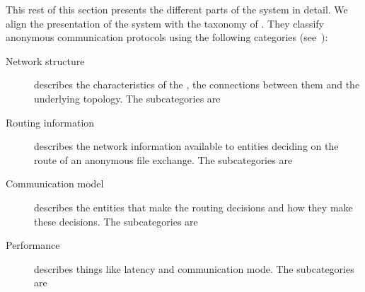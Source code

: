 This rest of this section presents the different parts of the system in detail.
We align the presentation of the system with the taxonomy of 
\textcite{RoutingSurveyAnonymousProtocols}.
They classify anonymous communication protocols using the following 
categories (see~\cite[Table 1]{RoutingSurveyAnonymousProtocols}):
\begin{description}
  \item[Network structure]
    describes the characteristics of the , the connections 
    between them and the underlying topology.
    The subcategories are

  \item[Routing information]
    describes the network information available to entities deciding on 
    the route of an anonymous file exchange.
    The subcategories are

  \item[Communication model]
    describes the entities that make the routing decisions and how they 
    make these decisions.
    The subcategories are

  \item[Performance]
    describes things like latency and communication mode.
    The subcategories are
\end{description}

